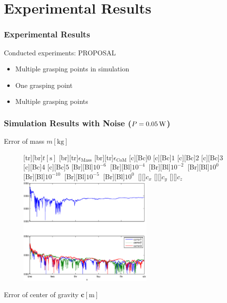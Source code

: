 \documentclass[student,noshadow]{ITRslides}
\renewcommand{\vec}[1]{\boldsymbol{#1}}
\renewcommand{\vec}[1]{\boldsymbol{#1}}
\newcommand{\scr}[1]{\mathrm{#1}}
\begin{document}
%	
%		

\section{Experimental Results}

\begin{frame}
	\frametitle{Experimental Results}
	Conducted experiments: PROPOSAL
	\begin{itemize}
		\item Multiple grasping points in simulation
		\item One grasping point
		\item Multiple grasping points
	\end{itemize}
\end{frame}

\begin{frame}
	\frametitle{Simulation Results with Noise ($P = \unit[0.05]{W}$)}
	\begin{center}
		Error of mass $m \left[\mathrm{kg}\right]$
		\begin{figure}
			[tr][br]{$t\left[\mathrm{s}\right]$}
			[br][tr]{$\epsilon_\scr{Mass}$}
			[br][tr]{$\epsilon_\scr{CoM}$}
			[c][Bc]{$0$}
			[c][Bc]{$1$}
			[c][Bc]{$2$}
			[c][Bc]{$3$}
			[c][Bc]{$4$}
			[c][Bc]{$5$}
			[Br][Bl]{$10^{-6}\  $}
			[Br][Bl]{$10^{-4}\  $}
			[Br][Bl]{$10^{-2}\  $}
			[Br][Bl]{$10^0\  $}
			[Br][Bl]{$10^{-10}\  $}
			[Br][Bl]{$10^{-5}\  $}
			[Br][Bl]{$10^0\  $}
			[][]{\tiny $c_{x}$}
			[][]{\tiny $c_{y}$}
			[][]{\tiny $c_{z}$}
			\includegraphics[width=0.6\textwidth]{fig/mass_multi_noise.eps}
		\end{figure}
		Error of center of gravity $\vec{c} \left[\mathrm{m}\right]$
	\end{center}
\end{frame}
\end{document}
